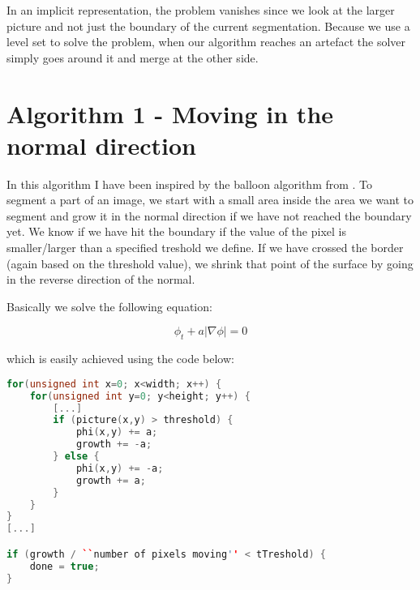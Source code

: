 In an implicit representation, the problem vanishes since we look at
the larger picture and not just the boundary of the current
segmentation. Because we use a level set to solve the problem, when
our algorithm reaches an artefact the solver simply goes around it and
merge at the other side.

\section{Algorithm 1 - Moving in the normal direction}
\label{segmentation:sec:algorithm1}

\begin{comment}
Start med noget mere overordnet og gå derefter i detaljer.

Læs igennem så det ikke står spredt men samlet.

Indsæt afsnit hvor jeg går direkte i dybden og overvej at fjerne
ligning 1.1

\end{comment}

In this algorithm I have been inspired by the balloon algorithm from
.  To segment a part of an image, we start with a
small area inside the area we want to segment and grow it in the
normal direction if we have not reached the boundary yet. We know if
we have hit the boundary if the value of the pixel is smaller/larger
than a specified treshold we define. If we have crossed the border
(again based on the threshold value), we shrink that point of the
surface by going in the reverse direction of the normal.



Basically we solve the following equation:

\begin{equation}
  \phi_{t} + a|\nabla{\phi}| = 0
\end{equation}

which is easily achieved using the code below: 

\begin{listing}
\begin{lstlisting}[language=c++]
for(unsigned int x=0; x<width; x++) {
    for(unsigned int y=0; y<height; y++) {
        [...]
        if (picture(x,y) > threshold) {
            phi(x,y) += a;
            growth += -a;
        } else {
            phi(x,y) += -a;
            growth += a;
        }
    }
}
[...]

if (growth / ``number of pixels moving'' < tTreshold) {
    done = true;
}
\end{lstlisting}
\label{segmentation:code}
\end{listing}


